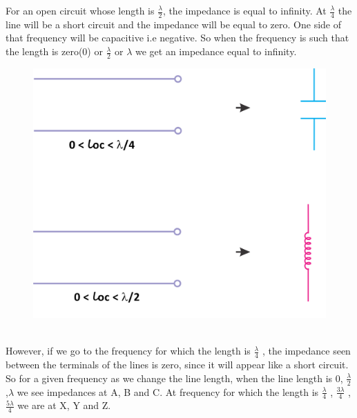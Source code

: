 For an open circuit whose length is $ \frac{\lambda}{2} $, the impedance is equal to infinity. At $ \frac{\lambda}{4} $ the line will be a short circuit and the impedance will be equal to zero. One side of that frequency will be capacitive i.e negative. So when the frequency is such that the length is zero(0) or $ \frac{\lambda}{2} $ or $ \lambda$ we get an impedance equal to infinity.
\begin{figure}[h]
\centering
\includegraphics[scale=0.4]{./graphics/group10diagram13}
\end{figure}\\However, if we go to the frequency for which the length is $ \frac{\lambda}{4} $ , the impedance seen between the terminals of the lines is zero, since it will appear like a short circuit. So for a given frequency as we change the line length, when the line
length is 0, $ \frac{\lambda}{2} $ ,$ \lambda $ we see impedances at A, B and C. At frequency for which the length is $ \frac{\lambda}{4} $ , $ \frac{3\lambda}{4} $ , $ \frac{5\lambda}{4} $ we are at X, Y and Z.
